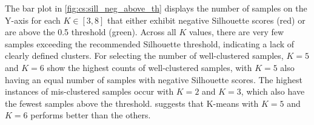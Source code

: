 The bar plot in \cref{fig:cs:sill_neg_above_th} displays the number of samples on the Y-axis for each $K \in [3, 8]$ that either exhibit negative Silhouette scores (red) or are above the 0.5 threshold (green). Across all $K$ values, there are very few samples exceeding the recommended Silhouette threshold, indicating a lack of clearly defined clusters. For selecting the number of well-clustered samples, $K=5$ and $K=6$ show the highest counts of well-clustered samples, with $K=5$ also having an equal number of samples with negative Silhouette scores. The highest instances of mis-clustered samples occur with $K=2$ and $K=3$, which also have the fewest samples above the threshold.  suggests that K-means with $K=5$ and $K=6$ performs better than the others.


